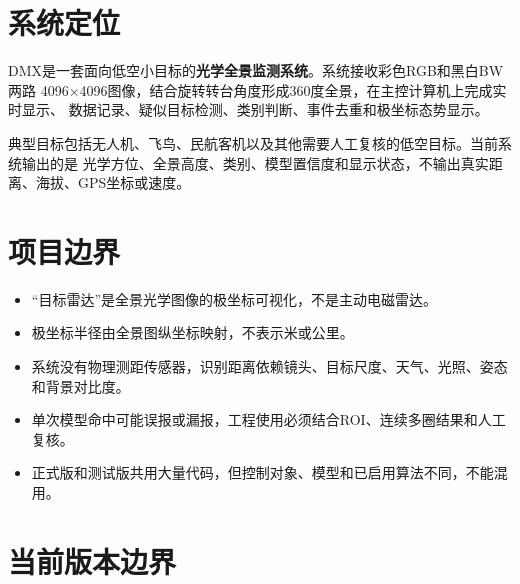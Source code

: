 \documentclass[UTF8,a4paper,11pt,openany]{ctexrep}
\begin{document}
\section{系统定位}

DMX是一套面向低空小目标的\textbf{光学全景监测系统}。系统接收彩色RGB和黑白BW两路
4096$\times$4096图像，结合旋转转台角度形成360度全景，在主控计算机上完成实时显示、
数据记录、疑似目标检测、类别判断、事件去重和极坐标态势显示。

典型目标包括无人机、飞鸟、民航客机以及其他需要人工复核的低空目标。当前系统输出的是
光学方位、全景高度、类别、模型置信度和显示状态，不输出真实距离、海拔、GPS坐标或速度。

\section{项目边界}

\begin{itemize}
  \item “目标雷达”是全景光学图像的极坐标可视化，不是主动电磁雷达。
  \item 极坐标半径由全景图纵坐标映射，不表示米或公里。
  \item 系统没有物理测距传感器，识别距离依赖镜头、目标尺度、天气、光照、姿态和背景对比度。
  \item 单次模型命中可能误报或漏报，工程使用必须结合ROI、连续多圈结果和人工复核。
  \item 正式版和测试版共用大量代码，但控制对象、模型和已启用算法不同，不能混用。
\end{itemize}

\section{当前版本边界}
\end{document}
